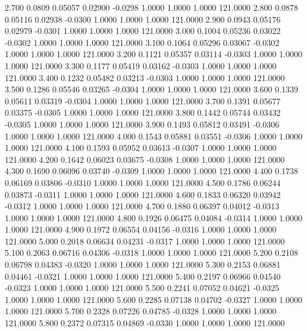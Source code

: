    2.700   0.0809   0.05057   0.02900  -0.0298   1.0000   1.0000   1.0000 121.0000
   2.800   0.0878   0.05116   0.02938  -0.0300   1.0000   1.0000   1.0000 121.0000
   2.900   0.0943   0.05176   0.02979  -0.0301   1.0000   1.0000   1.0000 121.0000
   3.000   0.1004   0.05236   0.03022  -0.0302   1.0000   1.0000   1.0000 121.0000
   3.100   0.1064   0.05296   0.03067  -0.0302   1.0000   1.0000   1.0000 121.0000
   3.200   0.1121   0.05357   0.03114  -0.0303   1.0000   1.0000   1.0000 121.0000
   3.300   0.1177   0.05419   0.03162  -0.0303   1.0000   1.0000   1.0000 121.0000
   3.400   0.1232   0.05482   0.03213  -0.0303   1.0000   1.0000   1.0000 121.0000
   3.500   0.1286   0.05546   0.03265  -0.0304   1.0000   1.0000   1.0000 121.0000
   3.600   0.1339   0.05611   0.03319  -0.0304   1.0000   1.0000   1.0000 121.0000
   3.700   0.1391   0.05677   0.03375  -0.0305   1.0000   1.0000   1.0000 121.0000
   3.800   0.1442   0.05744   0.03432  -0.0305   1.0000   1.0000   1.0000 121.0000
   3.900   0.1493   0.05812   0.03491  -0.0306   1.0000   1.0000   1.0000 121.0000
   4.000   0.1543   0.05881   0.03551  -0.0306   1.0000   1.0000   1.0000 121.0000
   4.100   0.1593   0.05952   0.03613  -0.0307   1.0000   1.0000   1.0000 121.0000
   4.200   0.1642   0.06023   0.03675  -0.0308   1.0000   1.0000   1.0000 121.0000
   4.300   0.1690   0.06096   0.03740  -0.0309   1.0000   1.0000   1.0000 121.0000
   4.400   0.1738   0.06169   0.03806  -0.0310   1.0000   1.0000   1.0000 121.0000
   4.500   0.1786   0.06244   0.03873  -0.0311   1.0000   1.0000   1.0000 121.0000
   4.600   0.1833   0.06320   0.03942  -0.0312   1.0000   1.0000   1.0000 121.0000
   4.700   0.1880   0.06397   0.04012  -0.0313   1.0000   1.0000   1.0000 121.0000
   4.800   0.1926   0.06475   0.04084  -0.0314   1.0000   1.0000   1.0000 121.0000
   4.900   0.1972   0.06554   0.04156  -0.0316   1.0000   1.0000   1.0000 121.0000
   5.000   0.2018   0.06634   0.04231  -0.0317   1.0000   1.0000   1.0000 121.0000
   5.100   0.2063   0.06716   0.04306  -0.0318   1.0000   1.0000   1.0000 121.0000
   5.200   0.2108   0.06798   0.04383  -0.0320   1.0000   1.0000   1.0000 121.0000
   5.300   0.2153   0.06881   0.04461  -0.0321   1.0000   1.0000   1.0000 121.0000
   5.400   0.2197   0.06966   0.04540  -0.0323   1.0000   1.0000   1.0000 121.0000
   5.500   0.2241   0.07052   0.04621  -0.0325   1.0000   1.0000   1.0000 121.0000
   5.600   0.2285   0.07138   0.04702  -0.0327   1.0000   1.0000   1.0000 121.0000
   5.700   0.2328   0.07226   0.04785  -0.0328   1.0000   1.0000   1.0000 121.0000
   5.800   0.2372   0.07315   0.04869  -0.0330   1.0000   1.0000   1.0000 121.0000

